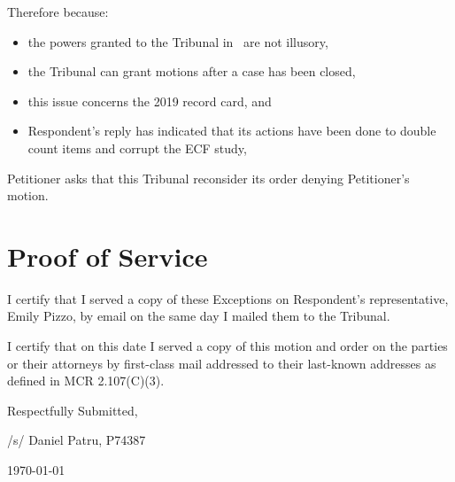 \documentclass[12pt,\documentclassflag]{michiganCourtOfAppealsBrief}
\begin{document}
Therefore because:

\begin{itemize}
\item the powers granted to the Tribunal in \cite{MCL 205.732(c)}\ are not illusory,
\item the Tribunal can grant motions after a case has been closed,
\item this issue concerns the 2019 record card, and 
\item Respondent's reply has indicated that its actions have been done to double count items and corrupt the ECF study,
\end{itemize}
Petitioner asks that this Tribunal reconsider its order denying Petitioner's motion.


\section{Proof of Service}

I certify that I served a copy of these Exceptions on Respondent's representative, Emily Pizzo, by email on the same day I mailed them to the Tribunal.

I certify that on this date I served a copy of this motion and order on the parties or their attorneys by first-class mail addressed to
their last-known addresses as defined in MCR 2.107(C)(3).

\vspace{1\baselineskip}

{ \setlength{\leftskip}{3.5in}

  Respectfully Submitted,

  /s/ Daniel Patru, P74387

\today

  \setlength{\leftskip}{0pt}}

\newpage\empty%
\end{document}
